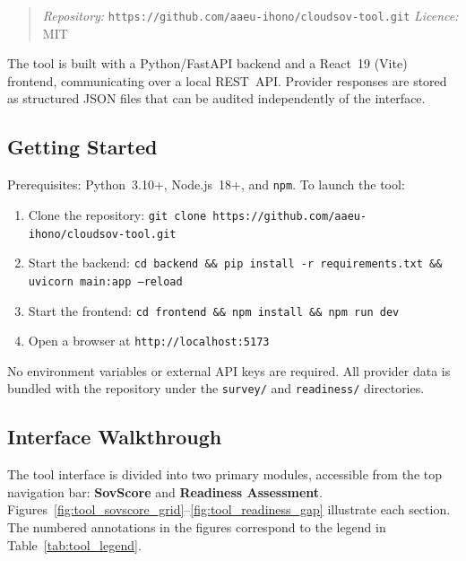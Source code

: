 \begin{quote}
\textit{Repository:} \texttt{https://github.com/aaeu-ihono/cloudsov-tool.git}
\textit{Licence:} MIT
\end{quote}

\noindent The tool is built with a Python/FastAPI backend and a React~19 (Vite) frontend, communicating over a local REST~API. Provider responses are stored as structured JSON files that can be audited independently of the interface.

\subsection{Getting Started}

Prerequisites: Python~3.10+, Node.js~18+, and \texttt{npm}. To launch the tool:

\begin{enumerate}
  \item Clone the repository: \texttt{git clone https://github.com/aaeu-ihono/cloudsov-tool.git}
  \item Start the backend: \texttt{cd backend \&\& pip install -r requirements.txt \&\& uvicorn main:app --reload}
  \item Start the frontend: \texttt{cd frontend \&\& npm install \&\& npm run dev}
  \item Open a browser at \texttt{http://localhost:5173}
\end{enumerate}

No environment variables or external API keys are required. All provider data is bundled with the repository under the \texttt{survey/} and \texttt{readiness/} directories.

\subsection{Interface Walkthrough}

The tool interface is divided into two primary modules, accessible from the top navigation bar: \textbf{SovScore} and \textbf{Readiness Assessment}. Figures~\ref{fig:tool_sovscore_grid}–\ref{fig:tool_readiness_gap} illustrate each section. The numbered annotations in the figures correspond to the legend in Table~\ref{tab:tool_legend}.


